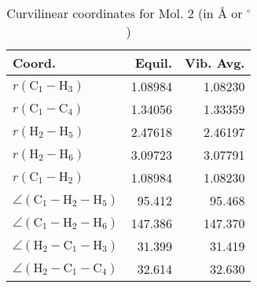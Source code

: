 \begin{table}
\centering
\caption{Curvilinear coordinates for Mol. 2 (in \AA{} or $^\circ$)}
\begin{tabular}{lrr}
       Coord.         &             Equil. &          Vib. Avg. \\
\hline
$r(\text{C}_{1} - \text{H}_{3})$ &            1.08984 &            1.08230 \\
$r(\text{C}_{1} - \text{C}_{4})$ &            1.34056 &            1.33359 \\
$r(\text{H}_{2} - \text{H}_{5})$ &            2.47618 &            2.46197 \\
$r(\text{H}_{2} - \text{H}_{6})$ &            3.09723 &            3.07791 \\
$r(\text{C}_{1} - \text{H}_{2})$ &            1.08984 &            1.08230 \\
$\angle(\text{C}_{1} - \text{H}_{2} - \text{H}_{5})$ &             95.412 &             95.468 \\
$\angle(\text{C}_{1} - \text{H}_{2} - \text{H}_{6})$ &            147.386 &            147.370 \\
$\angle(\text{H}_{2} - \text{C}_{1} - \text{H}_{3})$ &             31.399 &             31.419 \\
$\angle(\text{H}_{2} - \text{C}_{1} - \text{C}_{4})$ &             32.614 &             32.630 \\
\end{tabular}
\end{table}


